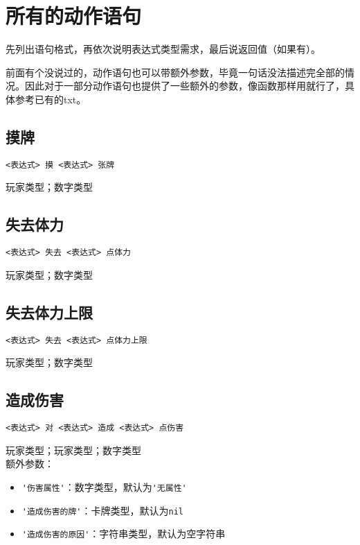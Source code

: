 \chapter{所有的动作语句}

先列出语句格式，再依次说明表达式类型需求，最后说返回值（如果有）。

前面有个没说过的，动作语句也可以带额外参数，毕竟一句话没法描述完全部的情况。因此对于一部分动作语句也提供了一些额外的参数，像函数那样用就行了，具体参考已有的txt。

\section{摸牌}

\begin{verbatim}
<表达式> 摸 <表达式> 张牌
\end{verbatim}

玩家类型；数字类型

\section{失去体力}

\begin{verbatim}
<表达式> 失去 <表达式> 点体力
\end{verbatim}

玩家类型；数字类型

\section{失去体力上限}

\begin{verbatim}
<表达式> 失去 <表达式> 点体力上限
\end{verbatim}

玩家类型；数字类型

\section{造成伤害}

\begin{verbatim}
<表达式> 对 <表达式> 造成 <表达式> 点伤害
\end{verbatim}

玩家类型；玩家类型；数字类型 \\

额外参数：

\begin{itemize}
  \item \verb|'伤害属性'|：数字类型，默认为\verb|'无属性'|
  \item \verb|'造成伤害的牌'|：卡牌类型，默认为\verb|nil|
  \item \verb|'造成伤害的原因'|：字符串类型，默认为空字符串
\end{itemize}

